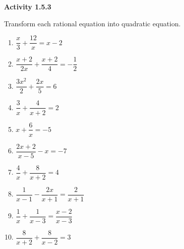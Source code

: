 \noindent\textbf{Activity 1.5.3}


Transform each rational equation into quadratic equation. 
\begin{multicols}{2}
\begin{enumerate}[label = \color{blue}\arabic*. ]
\item $ \dfrac{x}{3} + \dfrac{12}{x} = x-2 $

\item $ \dfrac{x+2}{2x} +  \dfrac{x+2}{4} = -\dfrac{1}{2} $

\item $ \dfrac{3x^{2}}{2} +  \dfrac{2x}{5} = 6 $

\item $ \dfrac{3}{x}  + \dfrac{4}{x+2} = 2 $

\item $ x + \dfrac{6}{x} =  -5 $
\item $ \dfrac{2x+2}{x-5} - x = -7 $
\item $ \dfrac{4}{x} + \dfrac{8}{x+2} = 4 $
\item $ \dfrac{1}{x-1} - \dfrac{2x}{x+1} = \dfrac{2}{x+1} $
\item $ \dfrac{1}{x} + \dfrac{1}{x-3} = \dfrac{x-2}{x-3} $
\item $ \dfrac{8}{x+2} + \dfrac{8}{x-2} = 3 $
\end{enumerate}
\end{multicols} 

